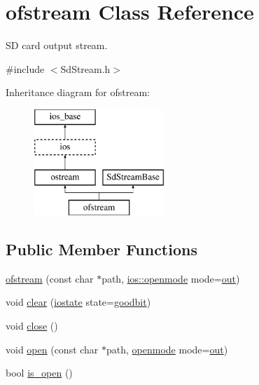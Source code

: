 \hypertarget{classofstream}{\section{ofstream Class Reference}
\label{classofstream}
}


S\-D card output stream.  




{\ttfamily \#include $<$Sd\-Stream.\-h$>$}

Inheritance diagram for ofstream\-:\begin{figure}[H]
\begin{center}
\leavevmode
\includegraphics[height=4.000000cm]{classofstream}
\end{center}
\end{figure}
\subsection*{Public Member Functions}
\begin{DoxyCompactItemize}
\item 
\hyperlink{classofstream_ab2226cccf0ba0eddfc6780e3aef38af3}{ofstream} (const char $\ast$path, \hyperlink{classios__base_a97a503456f60758f2c110f99b0ce0815}{ios\-::openmode} mode=\hyperlink{classios__base_a5300f1b3e0fe12cc7c484ab89f8bba83}{out})
\item 
void \hyperlink{classofstream_a1978eec476ebfeed466b5ce921853720}{clear} (\hyperlink{classios__base_a67209c853f091390e1a08ac0b043fe11}{iostate} state=\hyperlink{classios__base_ada0c8aa0797472d458523a3c2c475cdb}{goodbit})
\item 
void \hyperlink{classofstream_a5ae591df94fc66ccb85cbb6565368bca}{close} ()
\item 
void \hyperlink{classofstream_a958a6e7ea215ffd011bd882be4d1a0ce}{open} (const char $\ast$path, \hyperlink{classios__base_a97a503456f60758f2c110f99b0ce0815}{openmode} mode=\hyperlink{classios__base_a5300f1b3e0fe12cc7c484ab89f8bba83}{out})
\item 
bool \hyperlink{classofstream_a2f57f54d8c03b615bb31eee091d8a88a}{is\-\_\-open} ()
\end{DoxyCompactItemize}
